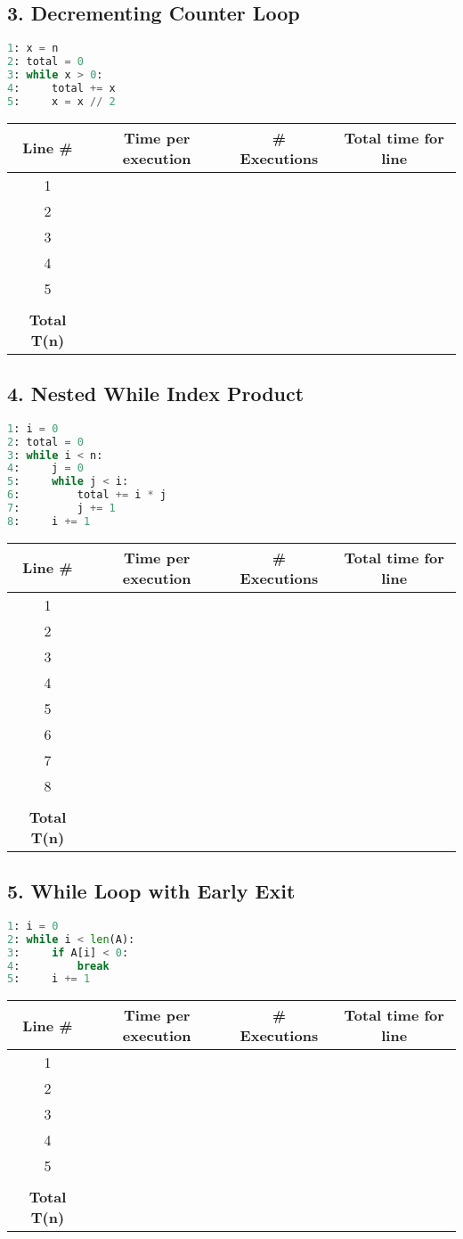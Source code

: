 \documentclass[12pt]{article}
\begin{document}
\subsection*{3. Decrementing Counter Loop}
\begin{lstlisting}[language=Python]
1: x = n
2: total = 0
3: while x > 0:
4:     total += x
5:     x = x // 2
\end{lstlisting}

\begin{tabular}{|c|c|c|c|}
\hline
Line \# & Time per execution & \# Executions & Total time for line \\
\hline
1 & & & \\
2 & & & \\
3 & & & \\
4 & & & \\
5 & & & \\
\hline
 & & & \\
\textbf{Total T(n)} & & & \\
\hline
\end{tabular}

\subsection*{4. Nested While Index Product}
\begin{lstlisting}[language=Python]
1: i = 0
2: total = 0
3: while i < n:
4:     j = 0
5:     while j < i:
6:         total += i * j
7:         j += 1
8:     i += 1
\end{lstlisting}

\begin{tabular}{|c|c|c|c|}
\hline
Line \# & Time per execution & \# Executions & Total time for line \\
\hline
1 & & & \\
2 & & & \\
3 & & & \\
4 & & & \\
5 & & & \\
6 & & & \\
7 & & & \\
8 & & & \\
\hline
 & & & \\
\textbf{Total T(n)} & & & \\
\hline
\end{tabular}

\subsection*{5. While Loop with Early Exit}
\begin{lstlisting}[language=Python]
1: i = 0
2: while i < len(A):
3:     if A[i] < 0:
4:         break
5:     i += 1
\end{lstlisting}

\begin{tabular}{|c|c|c|c|}
\hline
Line \# & Time per execution & \# Executions & Total time for line \\
\hline
1 & & & \\
2 & & & \\
3 & & & \\
4 & & & \\
5 & & & \\
\hline
 & & & \\
\textbf{Total T(n)} & & & \\
\hline
\end{tabular}
\end{document}
